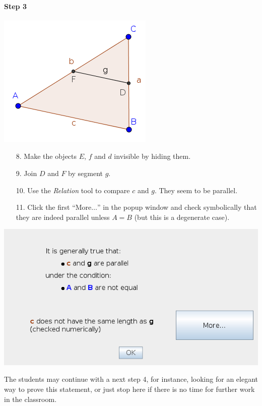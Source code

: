 \documentclass{article}
\begin{document}
\paragraph{Step 3}
\begin{center}
\includegraphics[scale=0.5]{classroom3}
\end{center}
\begin{enumerate}
    \item[8.] Make the objects $E$, $f$ and $d$ invisible by hiding them.
    \item[9.] Join $D$ and $F$ by segment $g$.
    \item[10.] Use the \textit{Relation} tool to compare $c$ and $g$. They seem to be parallel.
    \item[11.] Click the first ``More$\ldots$'' in the popup window and check symbolically that they are indeed parallel unless $A=B$ (but this is a degenerate case).
\end{enumerate}
\begin{center}
\includegraphics[scale=0.5]{classroom3-Relation-1}
\end{center}
The students may continue with a next step 4, for instance,  looking for an elegant way to prove this statement, or just stop here if there is no time for further work in the classroom.
\end{document}
